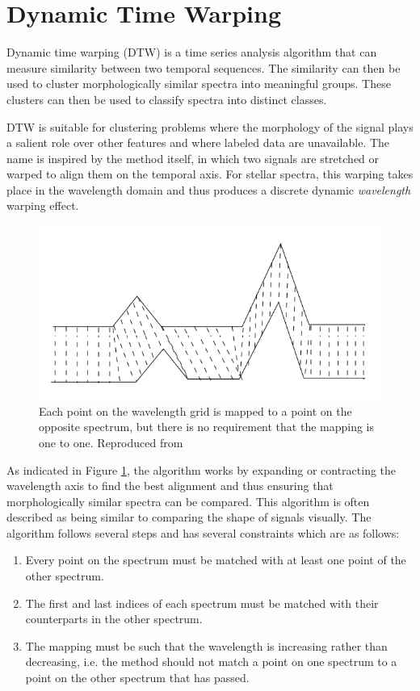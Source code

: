 \section{Dynamic Time Warping}

Dynamic time warping (DTW) is a time series analysis algorithm that can measure similarity between two temporal sequences. The similarity can then be used to cluster morphologically similar spectra into meaningful groups. These clusters can then be used to classify spectra into distinct classes. 

DTW is suitable for clustering problems where the morphology of the signal plays a salient role over other features \citep{nielsen2019practical} and where labeled data are unavailable. The name is inspired by the method itself, in which two signals are stretched or warped to align them on the temporal axis. For stellar spectra, this warping takes place in the wavelength domain and thus produces a discrete dynamic {\em wavelength} warping effect.

\begin{figure}[!htb]
\centering
\includegraphics[scale=1]{figures/Dynamic_time_warping.png}
\caption{Each point on the wavelength grid is mapped to a point on the opposite spectrum, but there is no requirement that the mapping is one to one. Reproduced from \citet{nielsen2019practical}}
\label{fig4.1}
\end{figure}

As indicated in Figure \ref{fig4.1}, the algorithm works by expanding or contracting the wavelength axis to find the best alignment and thus ensuring that morphologically similar spectra can be compared. This algorithm is often described as being similar to comparing the shape of signals visually. The algorithm follows several steps and has several constraints which are as follows:

\begin{enumerate}
    \item Every point on the spectrum must be matched with at least one point of the other spectrum.
    \item The first and last indices of each spectrum must be matched with their counterparts in the other spectrum.
    \item The mapping must be such that the wavelength is increasing rather than decreasing, i.e. the method should not match a point on one spectrum to a point on the other spectrum that has passed. 
\end{enumerate}

